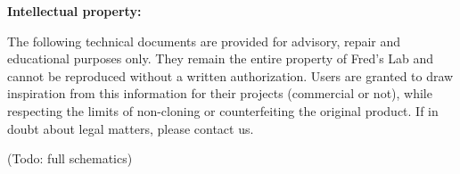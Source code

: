\documentclass{scrartcl}
\begin{document}
\textbf{Intellectual property:}

The following technical documents are provided for advisory, repair and educational purposes only. They remain the entire property of Fred's Lab and cannot be reproduced without a written authorization. Users are granted to draw inspiration from this information for their projects (commercial or not), while respecting the limits of non-cloning or counterfeiting the original product. If in doubt about legal matters, please contact us.

\begin{center}
    (Todo: full schematics)
\end{center}
\end{document}
